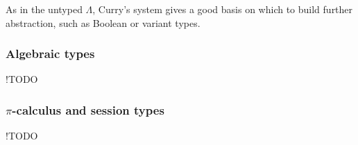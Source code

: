 As in the untyped $\Lambda$, Curry's system gives a good basis on which to build further abstraction, such as Boolean or variant types. \cite{tpl}

\subsubsection{Algebraic types} \label{bg:types:algebraic}

!TODO

\subsubsection{$\pi$-calculus and session types} \label{bg:types:session}

!TODO